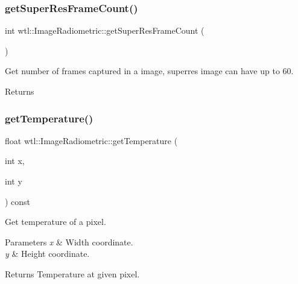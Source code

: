\subsubsection{\texorpdfstring{get\+Super\+Res\+Frame\+Count()}{getSuperResFrameCount()}}
{\footnotesize\ttfamily int wtl\+::\+Image\+Radiometric\+::get\+Super\+Res\+Frame\+Count (\begin{DoxyParamCaption}{ }\end{DoxyParamCaption})}



Get number of frames captured in a image, superres image can have up to 60. 

\begin{DoxyReturn}{Returns}

\end{DoxyReturn}
\mbox{\label{classwtl_1_1_image_radiometric_aafdb4f226d077b561cf429d55451d9d1}} 
\subsubsection{\texorpdfstring{get\+Temperature()}{getTemperature()}}
{\footnotesize\ttfamily float wtl\+::\+Image\+Radiometric\+::get\+Temperature (\begin{DoxyParamCaption}\item[{int}]{x,  }\item[{int}]{y }\end{DoxyParamCaption}) const}



Get temperature of a pixel. 


\begin{DoxyParams}{Parameters}
{\em x} & Width coordinate. \\
\hline
{\em y} & Height coordinate. \\
\hline
\end{DoxyParams}
\begin{DoxyReturn}{Returns}
Temperature at given pixel. 
\end{DoxyReturn}
\mbox{\label{classwtl_1_1_image_radiometric_ab0f5b66e57cccb1b210e27e869a1e440}} 
